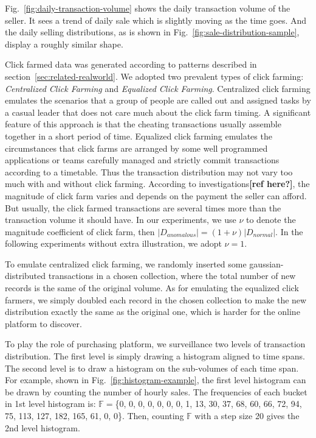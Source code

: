 \documentclass[10pt,conference,letterpaper]{IEEEtran}
\begin{document}
			Fig.~\ref{fig:daily-transaction-volume} shows the daily transaction volume of the seller. It sees a trend of daily sale which is slightly moving as the time goes. And the daily selling distributions, as is shown in Fig.~\ref{fig:sale-distribution-sample}, display a roughly similar shape.
			
			Click farmed data was generated according to patterns described in section~\ref{sec:related-realworld}. We adopted two prevalent types of click farming: \textit{Centralized Click Farming} and \textit{Equalized Click Farming}. Centralized click farming emulates the scenarios that a group of people are called out and assigned tasks by a casual leader that does not care much about the click farm timing. A significant feature of this approach is that the cheating transactions usually assemble together in a short period of time. Equalized click farming emulates the circumstances that click farms are arranged by some well programmed applications or teams carefully managed and strictly commit transactions according to a timetable. Thus the transaction distribution may not vary too much with and without click farming. According to investigations\textbf{[ref here?]}, the magnitude of click farm varies and depends on the payment the seller can afford. But usually, the click farmed transactions are several times more than the transaction volume it should have. In our experiments, we use $\nu$ to denote the magnitude coefficient of click farm, then $|D_{anomalous}| = (1 + \nu)|D_{normal}|$. In the following experiments without extra illustration, we adopt $\nu = 1$.
	
			To emulate centralized click farming, we randomly inserted some gaussian-distributed transactions in a chosen collection, where the total number of new records is the same of the original volume. As for emulating the equalized click farmers, we simply doubled each record in the chosen collection to make the new distribution exactly the same as the original one, which is harder for the online platform to discover.
			
			To play the role of purchasing platform, we surveillance two levels of transaction distribution. The first level is simply drawing a histogram aligned to time spans. The second level is to draw a histogram on the sub-volumes of each time span. For example, shown in Fig.~\ref{fig:histogram-example}, the first level histogram can be drawn by counting the number of hourly sales. The frequencies of each bucket in 1st level histogram is: $\mathbb{F}=$\{0, 0, 0, 0, 0, 0, 0, 1, 13, 30, 37, 68, 60, 66, 72, 94, 75, 113, 127, 182, 165, 61, 0, 0\}. Then, counting $\mathbb{F}$ with a step size 20 gives the 2nd level histogram.
	
\end{document}
